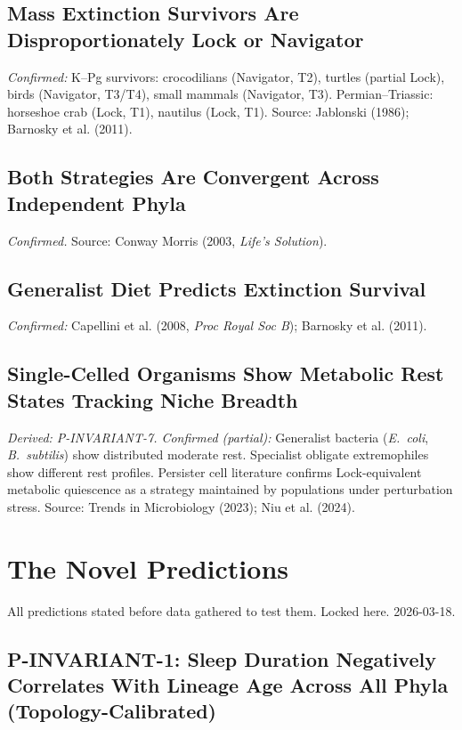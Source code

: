 \documentclass[10pt, a4paper]{article}
\begin{document}
\subsection{Mass Extinction Survivors Are
Disproportionately Lock or Navigator}
\textit{Confirmed:} K--Pg survivors:
crocodilians (Navigator, T2), turtles
(partial Lock), birds (Navigator, T3/T4),
small mammals (Navigator, T3).
Permian--Triassic: horseshoe crab (Lock,
T1), nautilus (Lock, T1).
Source: Jablonski (1986);
Barnosky et al. (2011).

\subsection{Both Strategies Are Convergent
Across Independent Phyla}
\textit{Confirmed.}
Source: Conway Morris (2003,
\textit{Life's Solution}).

\subsection{Generalist Diet Predicts
Extinction Survival}
\textit{Confirmed:}
Capellini et al. (2008,
\textit{Proc Royal Soc B});
Barnosky et al. (2011).

\subsection{Single-Celled Organisms Show
Metabolic Rest States Tracking Niche
Breadth}
\textit{Derived: P-INVARIANT-7.
Confirmed (partial):} Generalist bacteria
(\textit{E.~coli}, \textit{B.~subtilis})
show distributed moderate rest. Specialist
obligate extremophiles show different
rest profiles. Persister cell literature
confirms Lock-equivalent metabolic
quiescence as a strategy maintained by
populations under perturbation stress.
Source: Trends in Microbiology (2023);
Niu et al. (2024).

\section{The Novel Predictions}
\label{sec:predictions}

All predictions stated before data
gathered to test them.
Locked here. 2026-03-18.

\subsection{P-INVARIANT-1: Sleep Duration
Negatively Correlates With Lineage Age
Across All Phyla (Topology-Calibrated)}
\end{document}
